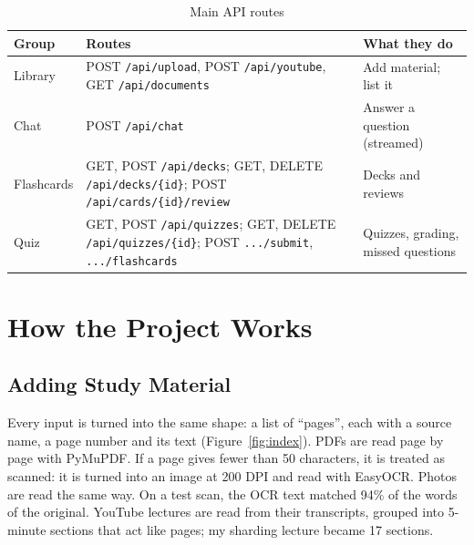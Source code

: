 \documentclass[12pt,a4paper]{report}
\newcommand{\code}[1]{\texttt{#1}}
\begin{document}
\begin{table}[H]
\centering
\caption{Main API routes}\label{tab:api}
\small
\begin{tabularx}{\textwidth}{@{}P{2.0cm}P{7.3cm}L@{}}
\toprule
\textbf{Group} & \textbf{Routes} & \textbf{What they do} \\
\midrule
Library    & POST \code{/api/upload}, POST \code{/api/youtube}, GET \code{/api/documents} & Add material; list it \\
Chat       & POST \code{/api/chat} & Answer a question (streamed) \\
Flashcards & GET, POST \code{/api/decks}; GET, DELETE \code{/api/decks/\{id\}}; POST \code{/api/cards/\{id\}/review} & Decks and reviews \\
Quiz       & GET, POST \code{/api/quizzes}; GET, DELETE \code{/api/quizzes/\{id\}}; POST \code{.../submit}, \code{.../flashcards} & Quizzes, grading, missed questions \\
\bottomrule
\end{tabularx}
\end{table}

\chapter{How the Project Works}

\section{Adding Study Material}
Every input is turned into the same shape: a list of ``pages'', each with a source name, a
page number and its text (Figure~\ref{fig:index}). PDFs are read page by page with PyMuPDF.
If a page gives fewer than 50 characters, it is treated as scanned: it is turned into an
image at 200 DPI and read with EasyOCR. Photos are read the same way. On a test scan, the OCR
text matched 94\% of the words of the original. YouTube lectures are read from their
transcripts, grouped into 5-minute sections that act like pages; my sharding lecture became
17 sections.
\end{document}
